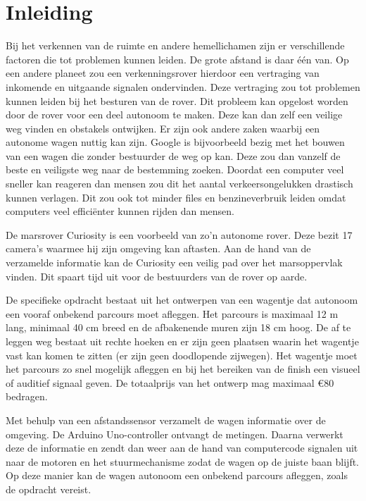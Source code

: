  
\section{Inleiding}
Bij het verkennen van de ruimte en andere hemellichamen zijn er verschillende 
factoren die tot problemen kunnen leiden. De grote afstand is daar één van. Op 
een andere planeet zou een verkenningsrover hierdoor een vertraging van 
inkomende en uitgaande signalen ondervinden. Deze vertraging zou tot problemen 
kunnen leiden bij het besturen van de rover. Dit probleem kan opgelost worden 
door de rover voor een deel autonoom te maken. Deze kan dan zelf een veilige 
weg 
vinden en obstakels ontwijken. Er zijn ook andere zaken waarbij een autonome 
wagen nuttig kan zijn. Google is bijvoorbeeld bezig met het bouwen van een 
wagen 
die zonder bestuurder de weg op kan. Deze zou dan vanzelf de beste en veiligste 
weg naar de bestemming zoeken. Doordat een computer veel sneller kan reageren dan mensen
zou dit het aantal verkeersongelukken drastisch kunnen verlagen. Dit zou ook tot minder files en 
benzineverbruik leiden omdat computers veel efficiënter kunnen rijden dan mensen. 
\cite{Googlecar}

De marsrover Curiosity is een voorbeeld van zo’n autonome rover. Deze bezit 17 
camera's waarmee hij zijn omgeving kan aftasten. Aan de hand van de verzamelde 
informatie kan de Curiosity een veilig pad over het marsoppervlak vinden. Dit 
spaart tijd uit voor de bestuurders van de rover op aarde.\cite{NASACuriosity, 
NASA2013-259} 

De specifieke opdracht bestaat uit het ontwerpen van een wagentje dat autonoom 
een vooraf onbekend parcours moet afleggen. Het parcours is maximaal 12 m lang, 
minimaal 40 cm breed en de afbakenende muren zijn 18 cm hoog. De af te leggen 
weg bestaat uit rechte hoeken en er zijn geen plaatsen waarin het wagentje vast 
kan komen te zitten (er zijn geen doodlopende zijwegen). Het wagentje moet het 
parcours zo snel mogelijk afleggen en bij het bereiken van de finish een 
visueel 
of auditief signaal geven. De totaalprijs van het ontwerp mag maximaal \euro 80 
bedragen.

Met behulp van een afstandssensor verzamelt de wagen informatie over de 
omgeving. De Arduino Uno-controller ontvangt de metingen. Daarna verwerkt deze  
de informatie en zendt dan weer aan de hand van computercode signalen uit naar 
de motoren en het stuurmechanisme zodat de wagen op de juiste baan blijft. Op 
deze manier kan de wagen autonoom een onbekend parcours afleggen, zoals 
de opdracht vereist.

